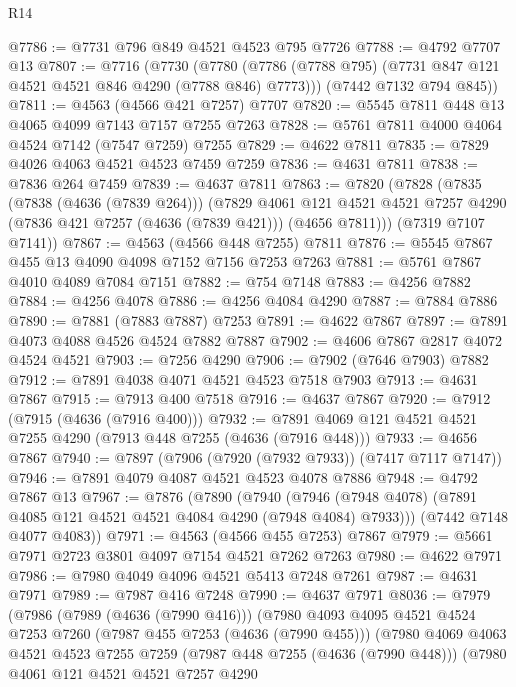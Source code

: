 \begin{lexlean}{R14}
\begin{coremodule}
@7786 := @7731 @796 @849 @4521 @4523 @795 @7726
@7788 := @4792 @7707 @13
@7807 := @7716
    (@7730
      (@7780 (@7786 (@7788 @795) (@7731 @847 @121 @4521 @4521 @846 @4290 (@7788 @846) @7773)))
      (@7442 @7132 @794 @845))
@7811 := @4563 (@4566 @421 @7257) @7707
@7820 := @5545 @7811 @448 @13 @4065 @4099 @7143 @7157 @7255 @7263
@7828 := @5761 @7811 @4000 @4064 @4524 @7142 (@7547 @7259) @7255
@7829 := @4622 @7811
@7835 := @7829 @4026 @4063 @4521 @4523 @7459 @7259
@7836 := @4631 @7811
@7838 := @7836 @264 @7459
@7839 := @4637 @7811
@7863 := @7820
    (@7828
      (@7835
        (@7838 (@4636 (@7839 @264)))
        (@7829
          @4061
          @121
          @4521
          @4521
          @7257
          @4290
          (@7836 @421 @7257 (@4636 (@7839 @421)))
          (@4656 @7811)))
      (@7319 @7107 @7141))
@7867 := @4563 (@4566 @448 @7255) @7811
@7876 := @5545 @7867 @455 @13 @4090 @4098 @7152 @7156 @7253 @7263
@7881 := @5761 @7867 @4010 @4089 @7084 @7151
@7882 := @754 @7148
@7883 := @4256 @7882
@7884 := @4256 @4078
@7886 := @4256 @4084 @4290
@7887 := @7884 @7886
@7890 := @7881 (@7883 @7887) @7253
@7891 := @4622 @7867
@7897 := @7891 @4073 @4088 @4526 @4524 @7882 @7887
@7902 := @4606 @7867 @2817 @4072 @4524 @4521
@7903 := @7256 @4290
@7906 := @7902 (@7646 @7903) @7882
@7912 := @7891 @4038 @4071 @4521 @4523 @7518 @7903
@7913 := @4631 @7867
@7915 := @7913 @400 @7518
@7916 := @4637 @7867
@7920 := @7912 (@7915 (@4636 (@7916 @400)))
@7932 := @7891 @4069 @121 @4521 @4521 @7255 @4290 (@7913 @448 @7255 (@4636 (@7916 @448)))
@7933 := @4656 @7867
@7940 := @7897 (@7906 (@7920 (@7932 @7933)) (@7417 @7117 @7147))
@7946 := @7891 @4079 @4087 @4521 @4523 @4078 @7886
@7948 := @4792 @7867 @13
@7967 := @7876
    (@7890
      (@7940 (@7946 (@7948 @4078) (@7891 @4085 @121 @4521 @4521 @4084 @4290 (@7948 @4084) @7933)))
      (@7442 @7148 @4077 @4083))
@7971 := @4563 (@4566 @455 @7253) @7867
@7979 := @5661 @7971 @2723 @3801 @4097 @7154 @4521 @7262 @7263
@7980 := @4622 @7971
@7986 := @7980 @4049 @4096 @4521 @5413 @7248 @7261
@7987 := @4631 @7971
@7989 := @7987 @416 @7248
@7990 := @4637 @7971
@8036 := @7979
    (@7986
      (@7989 (@4636 (@7990 @416)))
      (@7980
        @4093
        @4095
        @4521
        @4524
        @7253
        @7260
        (@7987 @455 @7253 (@4636 (@7990 @455)))
        (@7980
          @4069
          @4063
          @4521
          @4523
          @7255
          @7259
          (@7987 @448 @7255 (@4636 (@7990 @448)))
          (@7980
            @4061
            @121
            @4521
            @4521
            @7257
            @4290

\end{coremodule}
\end{lexlean}
